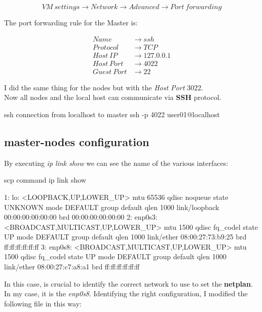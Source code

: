 $$
    VM\ settings \rightarrow Network \rightarrow Advanced \rightarrow Port\ forwarding
$$

The port forwarding rule for the Master is:

$$
    \begin{aligned}
        Name        & \rightarrow ssh       \\
        Protocol    & \rightarrow TCP       \\
        Host\ IP    & \rightarrow 127.0.0.1 \\
        Host\ Port  & \rightarrow 4022      \\
        Guest\ Port & \rightarrow 22
    \end{aligned}
$$

I did the same thing for the nodes but with the \textit{Host Port} 3022. \\
Now all nodes and the local host can communicate via \textbf{SSH} protocol.

\begin{codice}[style=bashstyle]{ssh connection from localhost to master}
    ssh -p 4022 user01@localhost
\end{codice}

\subsection{master-nodes configuration}
By executing \textit{ip link show} we can see the name of the various interfaces:

\begin{codice}[style=bashstyle]{scp command}
    ip link show

    1: lo: <LOOPBACK,UP,LOWER_UP> mtu 65536 qdisc noqueue state UNKNOWN mode DEFAULT group default qlen 1000
    link/loopback 00:00:00:00:00:00 brd 00:00:00:00:00:00
    2: enp0s3: <BROADCAST,MULTICAST,UP,LOWER_UP> mtu 1500 qdisc fq_codel state UP mode DEFAULT group default qlen 1000
    link/ether 08:00:27:73:b9:25 brd ff:ff:ff:ff:ff:ff
    3: enp0s8: <BROADCAST,MULTICAST,UP,LOWER_UP> mtu 1500 qdisc fq_codel state UP mode DEFAULT group default qlen 1000
    link/ether 08:00:27:c7:a8:a1 brd ff:ff:ff:ff:ff:ff
\end{codice}

In this case, is crucial to identify the correct network to use to set the \textbf{netplan}. \\
In my case, it is the \textit{enp0s8}. Identifying the right configuration, I modified the following file in this way:

